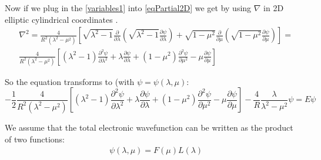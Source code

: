 Now if we plug in the \eqref{variables1} into \eqref{eqPartial2D} we get by using $ \nabla $ in 2D elliptic cylindrical coordinates \cite{MorseFeshbach} .
\begin{equation}
\begin{split}
& \nabla^2 = \frac{4}{ R^2 (\lambda^2-\mu^2) }\left[ \sqrt{\lambda^2-1}\frac{\partial}{\partial \lambda}\left(\sqrt{\lambda^2-1}\frac{\partial \psi}{\partial \lambda} \right) +
\sqrt{1-\mu^2}\frac{\partial}{\partial \mu}\left(\sqrt{1 - \mu^2}\frac{\partial \psi }{\partial \mu }\right) \right] = \\
& \frac{4}{ R^2 (\lambda^2-\mu^2) }\left[(\lambda^2-1)\frac{\partial^2 \psi}{\partial \lambda^2} + \lambda\frac{\partial \psi}{\partial \lambda} + (
1 - \mu^2)\frac{\partial^2 \psi}{\partial \mu^2} - \mu\frac{\partial \psi}{\partial \mu} \right]
\end{split}
\end{equation}

So the equation transforms to (with $ \psi = \psi(\lambda, \mu) $:
\begin{equation}\label{SchrFull-1}
-\frac{1}{2}\frac{4}{ R^2 (\lambda^2-\mu^2) }\left[(\lambda^2-1)\frac{\partial^2 \psi}{\partial \lambda^2} + \lambda\frac{\partial \psi}{\partial \lambda} +
(1 - \mu^2)\frac{\partial^2 \psi}{\partial \mu^2} - \mu\frac{\partial \psi}{\partial \mu} \right] - \frac{4}{R}\frac{\lambda}{\lambda^2-\mu^2}\psi = E \psi
\end{equation}

We assume that the total electronic wavefunction can be written as the product of two functions:
\begin{equation}\label{variables2}
\begin{split}
& \psi(\lambda,\mu) = F(\mu)L(\lambda)
\end{split}
\end{equation}

